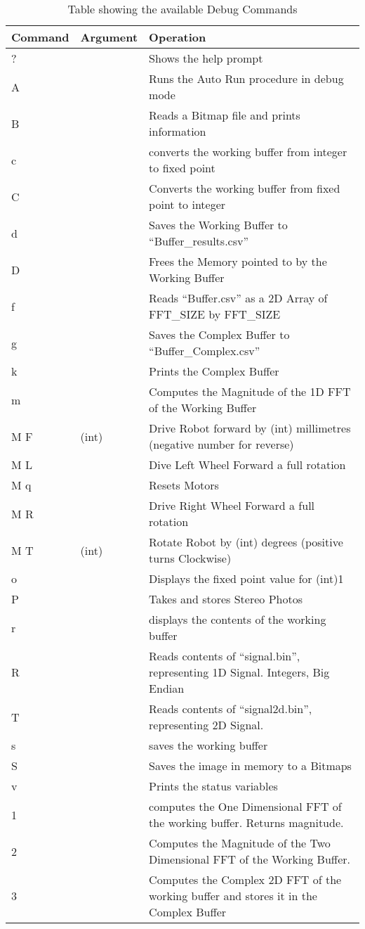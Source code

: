 \begin{table}
\centering
\caption{Table showing the available Debug Commands}
\label{table:Debug}
\begin{tabular}{|l|l|p{10cm}|}\hline
Command & Argument & Operation \\\hline
? && Shows the help prompt\\ 
A && Runs the Auto Run procedure in debug mode\\ 
B && Reads a Bitmap file and prints information \\ 
c && converts the working buffer from integer to fixed point\\
C && Converts the working buffer from fixed point to integer\\
d && Saves the Working Buffer to ``Buffer\_results.csv'' \\ 
D && Frees the Memory pointed to by the Working Buffer \\ 
f && Reads ``Buffer.csv'' as a 2D Array of FFT\_SIZE by FFT\_SIZE\\ 
g && Saves the Complex Buffer to ``Buffer\_Complex.csv'' \\
k && Prints the Complex Buffer \\ 
m && Computes the Magnitude of the 1D FFT of the Working Buffer \\
M F &(int) & Drive Robot forward by (int) millimetres (negative number for reverse)\\
M L && Dive Left Wheel Forward a full rotation \\
M q && Resets Motors \\
M R && Drive Right Wheel Forward a full rotation \\
M T &(int) & Rotate Robot by (int) degrees (positive turns Clockwise)\\
o && Displays the fixed point value for (int)1 \\
P && Takes and stores Stereo Photos \\ 
r && displays the contents of the working buffer\\
R && Reads contents of ``signal.bin'', representing 1D Signal. Integers, Big Endian\\
T && Reads contents of ``signal2d.bin'', representing 2D Signal. \\ 
s && saves the working buffer\\
S && Saves the image in memory to a Bitmaps \\
v && Prints the status variables \\ 
1 && computes the One Dimensional FFT of the working buffer. Returns magnitude.\\
2 && Computes the Magnitude of the Two Dimensional FFT of the Working Buffer. \\ 
3 && Computes the Complex 2D FFT of the working buffer and stores it in the Complex Buffer \\ \hline
\end{tabular}
\end{table}

